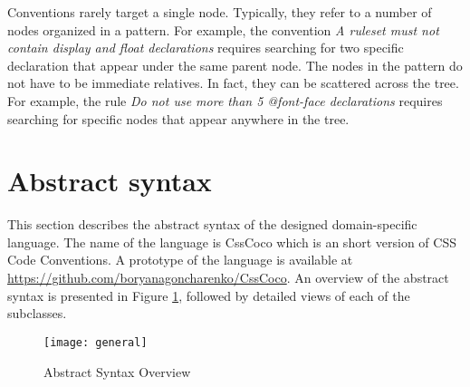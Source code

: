 \documentclass[parskip=full]{uvamscse}
\begin{document}
Conventions rarely target a single node. Typically, they refer to a number of nodes organized in a
pattern. For example, the convention \textit{A ruleset must not contain display and float
declarations} requires searching for two specific declaration that appear under the same parent
node. The nodes in the pattern do not have to be immediate relatives. In fact, they can be scattered
across the tree. For example, the rule \textit{Do not use more than 5 @font-face declarations} requires searching for specific nodes that appear anywhere in the tree.

\section{Abstract syntax}

This section describes the abstract syntax of the designed domain-specific language. The name of the
language is CssCoco which is an short version of CSS Code Conventions. A prototype of the language is available at \url{https://github.com/boryanagoncharenko/CssCoco}. An overview of the abstract
syntax is presented in Figure \ref{fig:astgeneral}, followed by detailed views of each of the subclasses. 

\begin{figure}[h!]
  \centering
  \caption{Abstract Syntax Overview}
  \label{fig:astgeneral}
  \texttt{[image: general]}
\end{figure}
\end{document}
